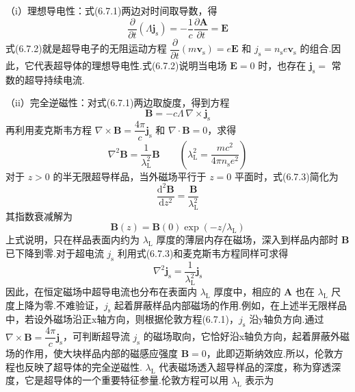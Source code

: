 （i）理想导电性：式(6.7.1)两边对时间取导数，得
\begin{equation}
  \frac{\partial}{\partial t}\left(\Lambda\boldsymbol{j}_{\mathrm{s}}\right)
  =-\frac{1}{c}\frac{\partial\boldsymbol{A}}{\partial t}=\boldsymbol{E}
\end{equation}
式(6.7.2)就是超导电子的无阻运动方程
$\dfrac{\partial}{\partial t}\left(m\boldsymbol{v}_{\mathrm{s}}\right)=e\boldsymbol{E}$
和 $j_{\mathrm{s}}=n_{\mathrm{s}}e\boldsymbol{v}_{\mathrm{s}}$ 的组合.因此，它代表超导体的理想导电性.式(6.7.2)说明当电场 $\boldsymbol{E}=0$ 时，也存在 $\boldsymbol{j}_{\mathrm{s}}=$ 常数的超导持续电流.

（ii）完全逆磁性：对式(6.7.1)两边取旋度，得到方程
\begin{equation}
  \boldsymbol{B}=-c\Lambda\,\nabla\times\boldsymbol{j}_{\mathrm{s}}
\end{equation}
再利用麦克斯韦方程 $\nabla\times\boldsymbol{B}=\dfrac{4\pi}{c}\boldsymbol{j}_{\mathrm{s}}$ 和 $\nabla\cdot\boldsymbol{B}=0$，求得
\begin{equation}
  \nabla^{2}\boldsymbol{B}=\frac{1}{\lambda_{\mathrm{L}}^{2}}\boldsymbol{B}
  \qquad\left(\lambda_{\mathrm{L}}^{2}=\frac{mc^{2}}{4\pi n_{\mathrm{s}}e^{2}}\right)
\end{equation}
对于 $z>0$ 的半无限超导样品，当外磁场平行于 $z=0$ 平面时，式(6.7.3)简化为
\begin{equation}
  \frac{\mathrm{d}^{2}\boldsymbol{B}}{\mathrm{d}z^{2}}
  =\frac{\boldsymbol{B}}{\lambda_{\mathrm{L}}^{2}}
\end{equation}
其指数衰减解为
\begin{equation}
  \boldsymbol{B}(z)=\boldsymbol{B}(0)\exp\left(-z/\lambda_{\mathrm{L}}\right)
\end{equation}
上式说明，只在样品表面内约为 $\lambda_{\mathrm{L}}$ 厚度的薄层内存在磁场，深入到样品内部时 $\boldsymbol{B}$ 已下降到零.对于超电流 $j_{\mathrm{s}}$ 利用式(6.7.3)和麦克斯韦方程同样可求得
\begin{equation}
  \nabla^{2}\boldsymbol{j}_{\mathrm{s}}=\frac{1}{\lambda_{\mathrm{L}}^{2}}\boldsymbol{j}_{\mathrm{s}}
\end{equation}
因此，在恒定磁场中超导电流也分布在表面内 $\lambda_{\mathrm{L}}$ 厚度中，相应的 $\boldsymbol{A}$ 也在 $\lambda_{\mathrm{L}}$ 尺度上降为零.不难验证，$j_{\mathrm{s}}$ 起着屏蔽样品内部磁场的作用.例如，在上述半无限样品中，若设外磁场沿正x轴方向，则根据伦敦方程(6.7.1)，$j_{\mathrm{s}}$ 沿y轴负方向.通过 $\nabla\times\boldsymbol{B}=\dfrac{4\pi}{c}\boldsymbol{j}_{\mathrm{s}}$，可判断超导流 $j_{\mathrm{s}}$ 的磁场取向，它恰好沿x轴负方向，起着屏蔽外磁场的作用，使大块样品内部的磁感应强度 $\boldsymbol{B}=0$，此即迈斯纳效应.所以，伦敦方程也反映了超导体的完全逆磁性. $\lambda_{\mathrm{L}}$ 代表磁场透入超导样品的深度，称为穿透深度，它是超导体的一个重要特征参量.伦敦方程可以用 $\lambda_{\mathrm{L}}$ 表示为
